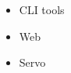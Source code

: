\begin{frame}
  \begin{itemize}
  \item CLI tools
  \item Web
  \item Servo
  \end{itemize}
\end{frame}